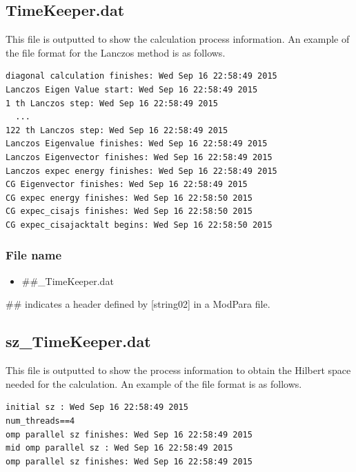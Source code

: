 \newpage
\subsection{TimeKeeper.dat}
This file is outputted to show the calculation process information.
An example of the file format for the Lanczos method is as follows.

\begin{minipage}{12.5cm}
\begin{screen}
\begin{verbatim}
diagonal calculation finishes: Wed Sep 16 22:58:49 2015
Lanczos Eigen Value start: Wed Sep 16 22:58:49 2015
1 th Lanczos step: Wed Sep 16 22:58:49 2015
  ...
122 th Lanczos step: Wed Sep 16 22:58:49 2015
Lanczos Eigenvalue finishes: Wed Sep 16 22:58:49 2015
Lanczos Eigenvector finishes: Wed Sep 16 22:58:49 2015
Lanczos expec energy finishes: Wed Sep 16 22:58:49 2015
CG Eigenvector finishes: Wed Sep 16 22:58:49 2015
CG expec energy finishes: Wed Sep 16 22:58:50 2015
CG expec_cisajs finishes: Wed Sep 16 22:58:50 2015
CG expec_cisajacktalt begins: Wed Sep 16 22:58:50 2015
\end{verbatim}
\end{screen}
\end{minipage}

\subsubsection{File name}
 \begin{itemize}
   \item  \#\#\_TimeKeeper.dat
  \end{itemize}
  \#\# indicates a header defined by [string02] in a ModPara file.

\subsection{sz\_TimeKeeper.dat}
This file is outputted to show the process information to obtain the Hilbert space needed for the calculation.
An example of the file format is as follows.

\begin{minipage}{12.5cm}
\begin{screen}
\begin{verbatim}
initial sz : Wed Sep 16 22:58:49 2015
num_threads==4
omp parallel sz finishes: Wed Sep 16 22:58:49 2015
mid omp parallel sz : Wed Sep 16 22:58:49 2015
omp parallel sz finishes: Wed Sep 16 22:58:49 2015
\end{verbatim}
\end{screen}
\end{minipage}


